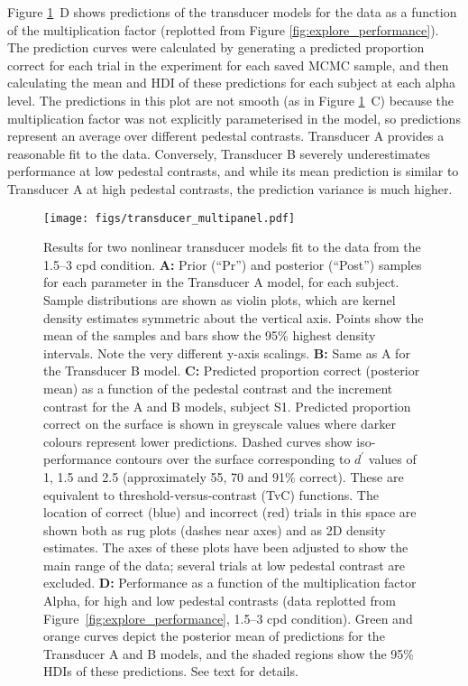 \documentclass[11pt,a4paper]{article}
\begin{document}
Figure \ref{fig:transducer}~D shows predictions of the transducer models for the data as a function of the multiplication factor (replotted from Figure \ref{fig:explore_performance}).
The prediction curves were calculated by generating a predicted proportion correct for each trial in the experiment for each saved MCMC sample, and then calculating the mean and HDI of these predictions for each subject at each alpha level.
The predictions in this plot are not smooth (as in Figure \ref{fig:transducer}~C) because the multiplication factor was not explicitly parameterised in the model, so predictions represent an average over different pedestal contrasts.
Transducer A provides a reasonable fit to the data.
Conversely, Transducer B severely underestimates performance at low pedestal contrasts, and while its mean prediction is similar to Transducer A at high pedestal contrasts, the prediction variance is much higher.

\begin{figure}[H]
\begin{center}
\texttt{[image: figs/transducer\_multipanel.pdf]}
\end{center}
\caption{
Results for two nonlinear transducer models fit to the data from the 1.5--3 cpd condition.
\textbf{A:} Prior (``Pr'') and posterior (``Post'') samples for each parameter in the Transducer A model, for each subject.
Sample distributions are shown as violin plots, which are kernel density estimates symmetric about the vertical axis.
Points show the mean of the samples and bars show the 95\% highest density intervals.
Note the very different y-axis scalings.
\textbf{B:} Same as A for the Transducer B model.
\textbf{C:} Predicted proportion correct (posterior mean) as a function of the pedestal contrast and the increment contrast for the A and B models, subject S1.
Predicted proportion correct on the surface is shown in greyscale values where darker colours represent lower predictions.
Dashed curves show iso-performance contours over the surface corresponding to $d^\prime$ values of 1, 1.5 and 2.5 (approximately 55, 70 and 91\% correct).
These are equivalent to threshold-versus-contrast (TvC) functions.
The location of correct (blue) and incorrect (red) trials in this space are shown both as rug plots (dashes near axes) and as 2D density estimates.
The axes of these plots have been adjusted to show the main range of the data; several trials at low pedestal contrast are excluded.
\textbf{D:} Performance as a function of the multiplication factor Alpha, for high and low pedestal contrasts (data replotted from Figure~\ref{fig:explore_performance}, 1.5--3 cpd condition).
Green and orange curves depict the posterior mean of predictions for the Transducer A and B models, and the shaded regions show the 95\% HDIs of these predictions.
See text for details.
}
\label{fig:transducer}
\end{figure}
\end{document}
